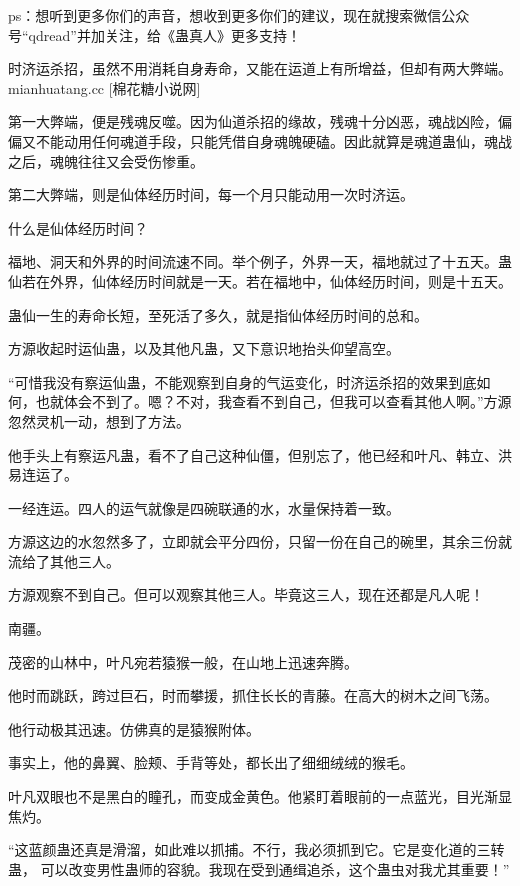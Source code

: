 
\begin{this_body}

ps：想听到更多你们的声音，想收到更多你们的建议，现在就搜索微信公众号“qdread”并加关注，给《蛊真人》更多支持！

时济运杀招，虽然不用消耗自身寿命，又能在运道上有所增益，但却有两大弊端。mianhuatang.cc [棉花糖小说网]

第一大弊端，便是残魂反噬。因为仙道杀招的缘故，残魂十分凶恶，魂战凶险，偏偏又不能动用任何魂道手段，只能凭借自身魂魄硬磕。因此就算是魂道蛊仙，魂战之后，魂魄往往又会受伤惨重。

第二大弊端，则是仙体经历时间，每一个月只能动用一次时济运。

什么是仙体经历时间？

福地、洞天和外界的时间流速不同。举个例子，外界一天，福地就过了十五天。蛊仙若在外界，仙体经历时间就是一天。若在福地中，仙体经历时间，则是十五天。

蛊仙一生的寿命长短，至死活了多久，就是指仙体经历时间的总和。

方源收起时运仙蛊，以及其他凡蛊，又下意识地抬头仰望高空。

“可惜我没有察运仙蛊，不能观察到自身的气运变化，时济运杀招的效果到底如何，也就体会不到了。嗯？不对，我查看不到自己，但我可以查看其他人啊。”方源忽然灵机一动，想到了方法。

他手头上有察运凡蛊，看不了自己这种仙僵，但别忘了，他已经和叶凡、韩立、洪易连运了。

一经连运。四人的运气就像是四碗联通的水，水量保持着一致。

方源这边的水忽然多了，立即就会平分四份，只留一份在自己的碗里，其余三份就流给了其他三人。

方源观察不到自己。但可以观察其他三人。毕竟这三人，现在还都是凡人呢！

南疆。

茂密的山林中，叶凡宛若猿猴一般，在山地上迅速奔腾。

他时而跳跃，跨过巨石，时而攀援，抓住长长的青藤。在高大的树木之间飞荡。

他行动极其迅速。仿佛真的是猿猴附体。

事实上，他的鼻翼、脸颊、手背等处，都长出了细细绒绒的猴毛。

叶凡双眼也不是黑白的瞳孔，而变成金黄色。他紧盯着眼前的一点蓝光，目光渐显焦灼。

“这蓝颜蛊还真是滑溜，如此难以抓捕。不行，我必须抓到它。它是变化道的三转蛊， 可以改变男性蛊师的容貌。我现在受到通缉追杀，这个蛊虫对我尤其重要！”


\end{this_body}
